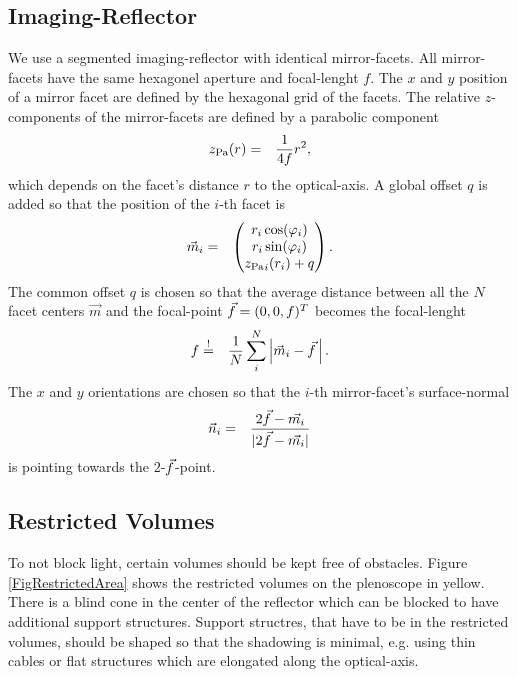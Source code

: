 \documentclass[11pt,a4paper,oneside,titlepage]{article}
\begin{document}
\subsection{Imaging-Reflector}
%
We use a segmented imaging-reflector with identical mirror-facets.
%
All mirror-facets have the same hexagonel aperture and focal-lenght $f$.
%
The $x$ and $y$ position of a mirror facet are defined by the hexagonal grid of the facets.
%
The relative $z$-components of the mirror-facets are defined by a parabolic component
%
\begin{eqnarray}
    {z_\text{Pa}}(r) &=& \frac{1}{4 f} r^2,
\end{eqnarray}
%
which depends on the facet's distance $r$ to the optical-axis.
%
A global offset $q$ is added so that the position of the $i$-th facet is
%
\begin{eqnarray}
\label{eq_mirror_position}
\vec{m}_{i} &=& \begin{pmatrix}
                            r_i \cos(\varphi_{i})\\
                            r_i \sin(\varphi_{i})\\
                            {z_\text{Pa}}_{i}(r_i) + q
                        \end{pmatrix}.
\end{eqnarray}
%
%
The common offset $q$ is chosen so that the average distance between all the $N$ facet centers $\vec{m}$ and the focal-point $\vec{f} = (0,0, f)^T$ becomes the focal-lenght
%
\begin{eqnarray}
    \label{eq_correct_focus}
    f &\stackrel{!}{=}& \frac{1}{N} \sum_{i}^N 
    \left \vert 
    \vec{m}_{i}- \vec{f}\,
    \right \vert.
\end{eqnarray}
%
The $x$ and $y$ orientations are chosen so that the $i$-th mirror-facet's surface-normal
%
\begin{eqnarray}
\label{eq_facet_normal}
\vec{n}_{i} &=& \frac{2\vec{f} - \vec{m_i}}{\vert 2\vec{f} - \vec{m_i} \vert}
\end{eqnarray}
%
is pointing towards the $2$-$\vec{f}$-point.
%
%
\subsection{Restricted Volumes}
%
To not block light, certain volumes should be kept free of obstacles.
%
Figure \ref{FigRestrictedArea} shows the restricted volumes on the plenoscope in yellow.
%
There is a blind cone in the center of the reflector which can be blocked to have additional support structures.
%
Support structres, that have to be in the restricted volumes, should be shaped so that the shadowing is minimal, e.g. using thin cables or flat structures which are elongated along the optical-axis.
%
%
\end{document}
